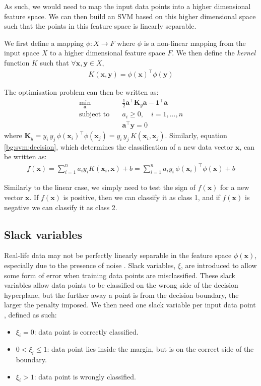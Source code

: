 \documentclass[12pt, twoside, a4paper]{report}
\def\vec{\boldsymbol}
\begin{document}
As such, we would need to map the input data points into a higher dimensional feature space. We can then build an SVM based on this higher dimensional space such that the points in this feature space is linearly separable.

We first define a mapping $\phi : X \rightarrow F$ where $\phi$ is a non-linear mapping from the input space $X$ to a higher dimensional feature space $F$. We then define the \textit{kernel} function $K$ such that $\forall \vec x, \vec y \in X$,
\begin{align*}
K(\vec x, \vec y) = \phi(\vec x)^\top \phi(\vec{y})
\end{align*}

The optimisation problem can then be written as:
\begin{align*}
\min_{\vec a} \quad &\frac{1}{2} \vec{a}^\top \vec{K}_y \vec{a} - \vec{1}^\top \vec a \\
\text{subject to} \quad &a_i \geq 0, \quad i = 1, \dots , n \\
&\vec{a}^\top \vec y = 0
\end{align*}
where $\vec{K}_y = y_i \, y_j \, \phi(\vec{x}_i)^\top \phi(\vec{x}_j) = y_i \, y_j \, K(\vec{x}_i, \vec{x}_j)$. Similarly, equation \ref{bg:svm:decision}, which determines the classification of a new data vector $\vec{x}$, can be written as:
\begin{align*}
f(\vec{x}) = \sum_{i=1}^n a_i y_i K(\vec{x}_i, \vec{x}) + b = \sum_{i=1}^n a_i y_i \, \phi(\vec{x}_i)^\top \phi(\vec{x}) + b
\end{align*}

Similarly to the linear case, we simply need to test the sign of $f(\vec{x})$ for a new vector $\vec{x}$. If $f(\vec{x})$ is positive, then we can classify it as class 1, and if $f(\vec{x})$ is negative we can classify it as class 2.

\subsection{Slack variables}
Real-life data may not be perfectly linearly separable in the feature space $\phi(\vec{x})$, especially due to the presence of noise \cite{RefWorks:127}. Slack variables, $\xi$, are introduced to allow some form of error when training data points are misclassified. These slack variables allow data points to be classified on the wrong side of the decision hyperplane, but the further away a point is from the decision boundary, the larger the penalty imposed. We then need one slack variable per input data point \cite{RefWorks:126}, defined as such:
\begin{itemize}
\item $\xi_i = 0$: data point is correctly classified.
\item $0 < \xi_i \leq 1$: data point lies inside the margin, but is on the correct side of the boundary.
\item $\xi_i > 1$: data point is wrongly classified.
\end{itemize}
\end{document}
